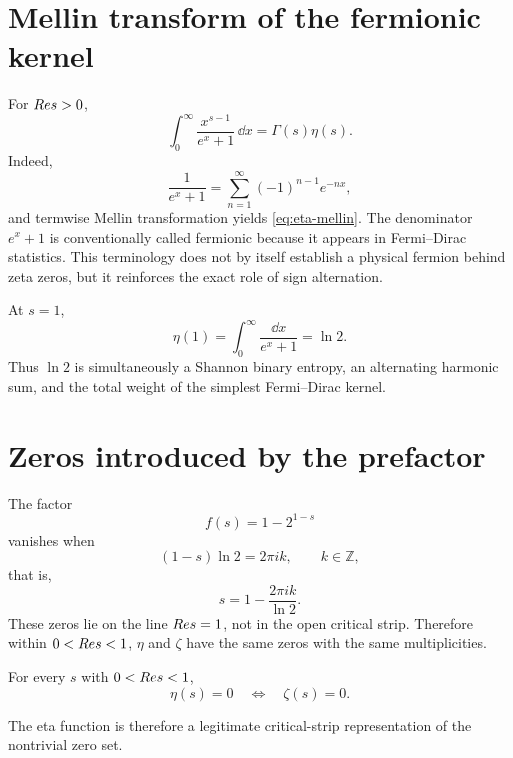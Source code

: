 \section{Mellin transform of the fermionic kernel}
For $Re s>0$,
\begin{equation}
\int_0^\infty \frac{x^{s-1}}{e^x+1}\,\dd x
=\Gamma(s)\eta(s).
\label{eq:eta-mellin}
\end{equation}
Indeed,
\begin{equation}
\frac{1}{e^x+1}
=\sum_{n=1}^{\infty}(-1)^{n-1}e^{-nx},
\end{equation}
and termwise Mellin transformation yields \eqref{eq:eta-mellin}. The denominator $e^x+1$ is conventionally called fermionic because it appears in Fermi--Dirac statistics. This terminology does not by itself establish a physical fermion behind zeta zeros, but it reinforces the exact role of sign alternation.

At $s=1$,
\begin{equation}
\eta(1)
=\int_0^\infty\frac{\dd x}{e^x+1}
=\ln2.
\end{equation}
Thus $\ln2$ is simultaneously a Shannon binary entropy, an alternating harmonic sum, and the total weight of the simplest Fermi--Dirac kernel.

\section{Zeros introduced by the prefactor}
The factor
\begin{equation}
f(s)=1-2^{1-s}
\end{equation}
vanishes when
\begin{equation}
(1-s)\ln2=2\pi i k,
\qquad k\in\mathbb Z,
\end{equation}
that is,
\begin{equation}
s=1-\frac{2\pi i k}{\ln2}.
\end{equation}
These zeros lie on the line $Re s=1$, not in the open critical strip. Therefore within $0<Re s<1$, $\eta$ and $\zeta$ have the same zeros with the same multiplicities.

\begin{proposition}
For every $s$ with $0<Re s<1$,
\begin{equation}
\eta(s)=0\quad\Longleftrightarrow\quad\zeta(s)=0.
\end{equation}
\end{proposition}

The eta function is therefore a legitimate critical-strip representation of the nontrivial zero set.


